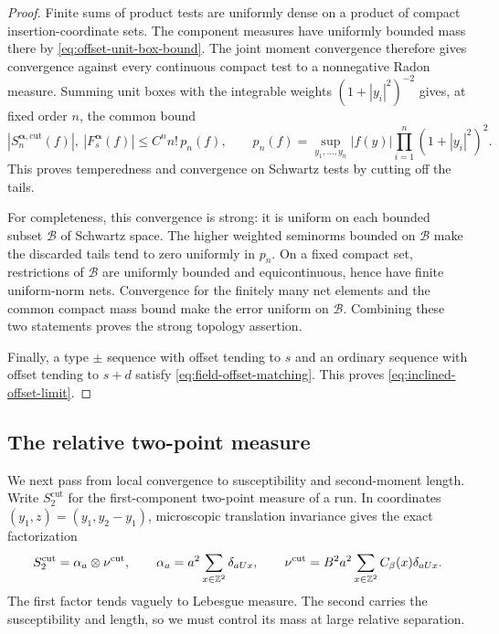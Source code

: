 \begin{proof}
Finite sums of product tests are uniformly dense on a product of
compact insertion-coordinate sets.  The component measures have
uniformly bounded mass there by \eqref{eq:offset-unit-box-bound}.
The joint moment convergence therefore gives convergence against every
continuous compact test to a nonnegative Radon measure.  Summing unit
boxes with the integrable weights $(1+|y_i|^2)^{-2}$ gives, at fixed
order $n$, the common bound
\begin{equation}
 |S_n^{\boldsymbol\alpha,\mathrm{cut}}(f)|,
 \ |F_s^{\boldsymbol\alpha}(f)|
 \le C^n n!\,p_n(f),\qquad
 p_n(f)=\sup_{y_1,\ldots,y_n}|f(y)|
                    \prod_{i=1}^n(1+|y_i|^2)^2.
 \label{eq:offset-schwartz-bound}
\end{equation}
This proves temperedness and convergence on Schwartz tests by cutting
off the tails.

For completeness, this convergence is strong: it is uniform on each
bounded subset $\mathcal B$ of Schwartz space.  The higher weighted
seminorms bounded on $\mathcal B$ make the discarded tails tend to zero
uniformly in $p_n$.  On a fixed compact set, restrictions of
$\mathcal B$ are uniformly bounded and equicontinuous, hence have
finite uniform-norm nets.  Convergence for the finitely many net
elements and the common compact mass bound make the error uniform on
$\mathcal B$.  Combining these two statements proves the strong
topology assertion.

Finally, a type $\pm$ sequence with offset tending to $s$ and an
ordinary sequence with offset tending to $s+d$ satisfy
\eqref{eq:field-offset-matching}.  This proves
\eqref{eq:inclined-offset-limit}.
\end{proof}

\subsection{The relative two-point measure}

We next pass from local convergence to susceptibility and second-moment
length.  Write $S_2^{\mathrm{cut}}$ for the first-component two-point
measure of a run.  In coordinates $(y_1,z)=(y_1,y_2-y_1)$, microscopic
translation invariance gives the exact factorization
\begin{equation}
 S_2^{\mathrm{cut}}=\alpha_a\otimes\nu^{\mathrm{cut}},\qquad
 \alpha_a=a^2\sum_{x\in\mathbb Z^2}\delta_{aUx},\qquad
 \nu^{\mathrm{cut}}=B^2a^2\sum_{x\in\mathbb Z^2}
                          C_\beta(x)\delta_{aUx}.
 \label{eq:relative-factorization}
\end{equation}
The first factor tends vaguely to Lebesgue measure.  The second carries
the susceptibility and length, so we must control its mass at large
relative separation.

